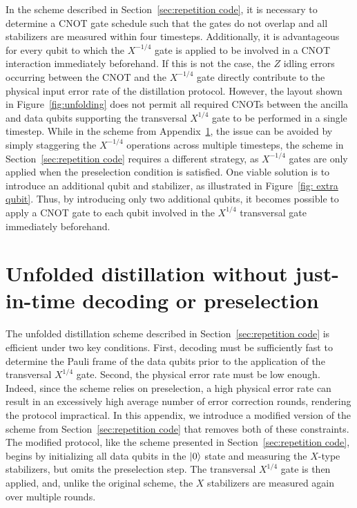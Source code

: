 \documentclass[%
 reprint,
superscriptaddress,
 amsmath,amssymb,
 aps,
]{revtex4-2}
\begin{document}
In the scheme described in Section~\ref{sec:repetition code}, it is necessary to determine a CNOT gate schedule such that the gates do not overlap and all stabilizers are measured within four timesteps. Additionally, it is advantageous for every qubit to which the $X^{-1/4}$ gate is applied to be involved in a CNOT interaction immediately beforehand. If this is not the case, the $Z$ idling errors occurring between the CNOT and the $X^{-1/4}$ gate directly contribute to the physical input error rate of the distillation protocol. However, the layout shown in Figure~\ref{fig:unfolding} does not permit all required CNOTs between the ancilla and data qubits supporting the transversal $X^{1/4}$ gate to be performed in a single timestep. While in the scheme from Appendix~\ref{app:Clifford ladder}, the issue can be avoided by simply staggering the $X^{-1/4}$ operations across multiple timesteps, the scheme in Section~\ref{sec:repetition code} requires a different strategy, as $X^{-1/4}$ gates are only applied when the preselection condition is satisfied. One viable solution is to introduce an additional qubit and stabilizer, as illustrated in Figure~\ref{fig: extra qubit}. Thus, by introducing only two additional qubits, it becomes possible to apply a CNOT gate to each qubit involved in the $X^{1/4}$ transversal gate immediately beforehand.

\section{Unfolded distillation without just-in-time decoding or preselection}
\label{app:Clifford ladder}

The unfolded distillation scheme described in Section~\ref{sec:repetition code} is efficient under two key conditions. First, decoding must be sufficiently fast to determine the Pauli frame of the data qubits prior to the application of the transversal $X^{1/4}$ gate. Second, the physical error rate must be low enough. Indeed, since the scheme relies on preselection, a high physical error rate can result in an excessively high average number of error correction rounds, rendering the protocol impractical. In this appendix, we introduce a modified version of the scheme from Section~\ref{sec:repetition code} that removes both of these constraints. The modified protocol, like the scheme presented in Section~\ref{sec:repetition code}, begins by initializing all data qubits in the $\ket{0}$ state and measuring the $X$-type stabilizers, but omits the preselection step. The transversal $X^{1/4}$ gate is then applied, and, unlike the original scheme, the $X$ stabilizers are measured again over multiple rounds.
\end{document}
